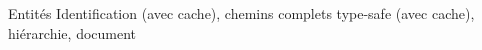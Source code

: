\begin{block}{Entités}
Identification (avec cache), chemins complets type-safe (avec cache), hiérarchie, document
\end{block}